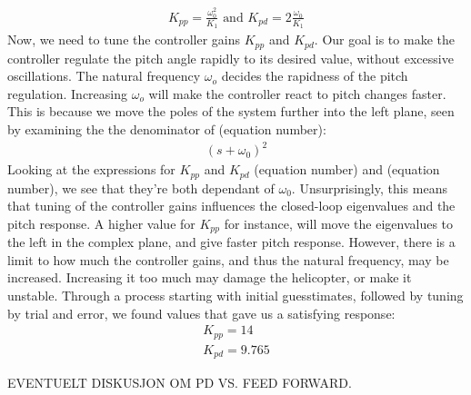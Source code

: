 \begin{gather*}
    K_{pp} = \frac{\omega_0^2}{K_1} \text{ and } K_{pd} = 2 \frac{\omega_0}{K_1}
\end{gather*}
Now, we need to tune the controller gains $K_{pp}$ and $K_{pd}$. Our goal is to make the controller regulate the pitch angle rapidly to its desired value, without excessive oscillations. The natural frequency $\omega_o$ decides the rapidness of the pitch regulation. Increasing $\omega_o$ will make the controller react to pitch changes faster. This is because we move the poles of the system further into the left plane, seen by examining the the denominator of (equation number):
\begin{gather*}
    (s + \omega_0)^2
\end{gather*}
 Looking at the expressions for  $K_{pp}$ and $K_{pd}$ (equation number) and (equation number), we see that they're both dependant of $\omega_0$. Unsurprisingly, this means that tuning of the controller gains influences the closed-loop eigenvalues and the pitch response. A higher value for $K_{pp}$ for instance, will move the eigenvalues to the left in the complex plane, and give faster pitch response. However, there is a limit to how much the controller gains, and thus the natural frequency, may be increased. Increasing it too much may damage the helicopter, or make it unstable. 
 Through a process starting with initial guesstimates, followed by tuning by trial and error, we found values that gave us a satisfying response:
\begin{gather*}
    K_{pp} = 14 \\ 
    K_{pd} = 9.765
\end{gather*}

EVENTUELT DISKUSJON OM PD VS. FEED FORWARD.

